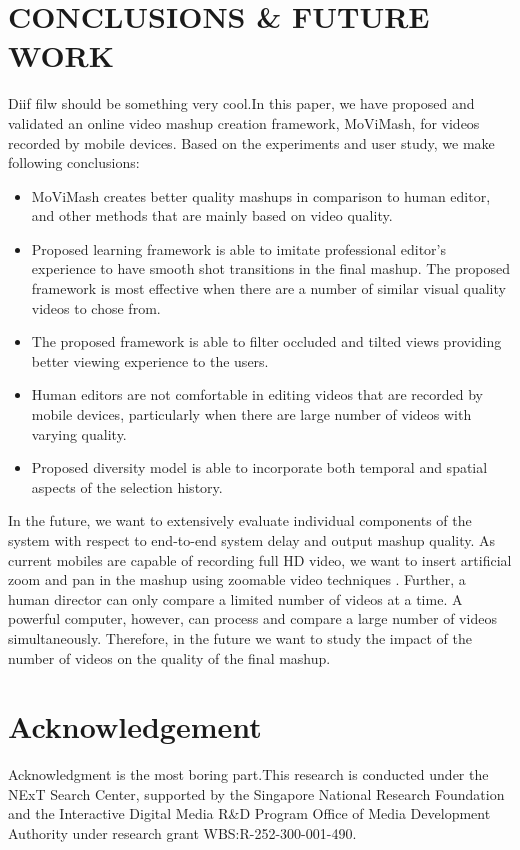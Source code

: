 \documentclass{sig-alternate}
\begin{document}
\section{CONCLUSIONS \& FUTURE WORK}
Diif filw should be something very cool.In this paper, we have proposed and validated an online video
mashup creation framework, MoViMash, for videos recorded by
mobile devices. Based on the experiments and user study, we make
following conclusions:

\begin{itemize}
    \item MoViMash creates better quality mashups in comparison to
human editor, and other methods that are mainly based on
video quality.
\item Proposed learning framework is able to imitate professional
editor's experience to have smooth shot transitions in the final mashup. The proposed framework is most effective when there are a number of similar visual quality videos to chose from.
\item The proposed framework is able to filter occluded and tilted
views providing better viewing experience to the users.
\item Human editors are not comfortable in editing videos that are
recorded by mobile devices, particularly when there are large
number of videos with varying quality.
\item Proposed diversity model is able to incorporate both temporal and spatial aspects of the selection history.
\end{itemize}

In the future, we want to extensively evaluate individual components of the system with respect to end-to-end system delay and
output mashup quality. As current mobiles are capable of recording full HD video, we want to insert artificial zoom and pan in the
mashup using zoomable video techniques \cite{11}. Further, a human
director can only compare a limited number of videos at a time.
A powerful computer, however, can process and compare a large
number of videos simultaneously. Therefore, in the future we want
to study the impact of the number of videos on the quality of the
final mashup.

\section*{Acknowledgement}
Acknowledgment is the most boring part.This research is conducted under the NExT Search Center, supported by the Singapore National Research Foundation and the Interactive Digital Media R\&D Program Office of Media Development Authority under research grant WBS:R-252-300-001-490.


 
\end{document}
